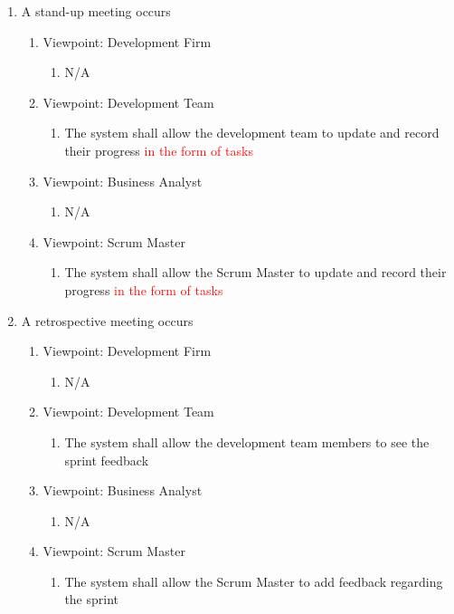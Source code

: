 \documentclass[12pt, titlepage]{article}
\begin{document}
\begin{enumerate}[{BE}1.]
    \item A stand-up meeting occurs     %
    \begin{enumerate}[{VP}1.] 
        \item Viewpoint: Development Firm
            \begin{enumerate}
                \item[] N/A
            \end{enumerate}
        \item Viewpoint: Development Team
            \begin{enumerate}
                \item The system shall allow the development team to update and record their progress \textcolor{red}{in the form of tasks}
            \end{enumerate}
        \item Viewpoint: Business Analyst
            \begin{enumerate}
                \item[] N/A
            \end{enumerate}
        \item Viewpoint: Scrum Master
            \begin{enumerate}
                \item The system shall allow the Scrum Master to update and record their progress \textcolor{red}{in the form of tasks}
            \end{enumerate}
    \end{enumerate}

    \item A retrospective meeting occurs     %
    \begin{enumerate}[{VP}1.] 
        \item Viewpoint: Development Firm
            \begin{enumerate}
                \item[] N/A
            \end{enumerate}
        \item Viewpoint: Development Team
            \begin{enumerate}
                \item The system shall allow the development team members to see the sprint feedback
            \end{enumerate}
        \item Viewpoint: Business Analyst
            \begin{enumerate}
                \item[] N/A
            \end{enumerate}
        \item Viewpoint: Scrum Master
            \begin{enumerate}
                \item The system shall allow the Scrum Master to add feedback regarding the sprint
            \end{enumerate}
    \end{enumerate}
    

\end{enumerate}
\end{document}
